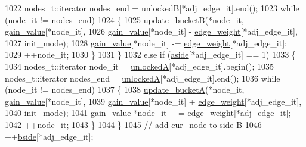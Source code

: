 \begin{DoxyCode}
1022             nodes\_t::iterator nodes\_end = \mbox{\hyperlink{classratio__cut__partition_af7c877d8c6e9b533ab34cde1c6690b25}{unlockedB}}[*adj\_edge\_it].end();
1023             \textcolor{keywordflow}{while} (node\_it != nodes\_end)
1024             \{
1025                 \mbox{\hyperlink{classratio__cut__partition_abe5d474e6d99c7bb200071d6484b5358}{update\_bucketB}}(*node\_it, \mbox{\hyperlink{classratio__cut__partition_af24ff191abbb0578f0bfc54fef5f6d45}{gain\_value}}[*node\_it],
1026                     \mbox{\hyperlink{classratio__cut__partition_af24ff191abbb0578f0bfc54fef5f6d45}{gain\_value}}[*node\_it] - \mbox{\hyperlink{classratio__cut__partition_a48a85c82fb09b83c9d494d6d1232fab2}{edge\_weight}}[*adj\_edge\_it],
1027                     init\_mode);
1028                 \mbox{\hyperlink{classratio__cut__partition_af24ff191abbb0578f0bfc54fef5f6d45}{gain\_value}}[*node\_it] -= \mbox{\hyperlink{classratio__cut__partition_a48a85c82fb09b83c9d494d6d1232fab2}{edge\_weight}}[*adj\_edge\_it];
1029                 ++node\_it;
1030             \}
1031         \}
1032         \textcolor{keywordflow}{else} \textcolor{keywordflow}{if} (\mbox{\hyperlink{classratio__cut__partition_a112bfcfb9d05d5bbdeb29576a61399e1}{aside}}[*adj\_edge\_it] == 1)
1033         \{
1034             nodes\_t::iterator node\_it = \mbox{\hyperlink{classratio__cut__partition_a9e4d0ba86475bd0faa98e01c6be4dde0}{unlockedA}}[*adj\_edge\_it].begin();
1035             nodes\_t::iterator nodes\_end = \mbox{\hyperlink{classratio__cut__partition_a9e4d0ba86475bd0faa98e01c6be4dde0}{unlockedA}}[*adj\_edge\_it].end();
1036             \textcolor{keywordflow}{while} (node\_it != nodes\_end)
1037             \{
1038                 \mbox{\hyperlink{classratio__cut__partition_acbd0608a7e5560a52c447711cb59a644}{update\_bucketA}}(*node\_it, \mbox{\hyperlink{classratio__cut__partition_af24ff191abbb0578f0bfc54fef5f6d45}{gain\_value}}[*node\_it],
1039                     \mbox{\hyperlink{classratio__cut__partition_af24ff191abbb0578f0bfc54fef5f6d45}{gain\_value}}[*node\_it] + \mbox{\hyperlink{classratio__cut__partition_a48a85c82fb09b83c9d494d6d1232fab2}{edge\_weight}}[*adj\_edge\_it],
1040                     init\_mode);
1041                 \mbox{\hyperlink{classratio__cut__partition_af24ff191abbb0578f0bfc54fef5f6d45}{gain\_value}}[*node\_it] += \mbox{\hyperlink{classratio__cut__partition_a48a85c82fb09b83c9d494d6d1232fab2}{edge\_weight}}[*adj\_edge\_it];
1042                 ++node\_it;
1043             \}
1044         \}
1045         \textcolor{comment}{// add cur\_node to side B}
1046         ++\mbox{\hyperlink{classratio__cut__partition_ab9c1166efb1cbb65ff6c55bb6e3c9e6d}{bside}}[*adj\_edge\_it];

\end{DoxyCode}

